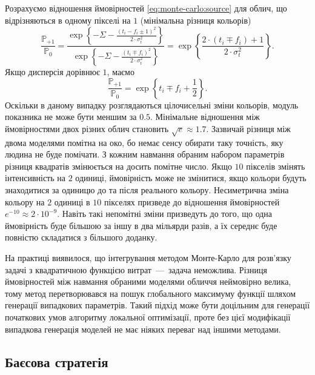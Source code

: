 Розрахуємо відношення ймовірностей \eqref{eq:monte-carlo:source} для облич,
що відрізняються в одному пікселі на $1$ (мінімальна різниця кольорів)
\begin{equation*}
  \frac{\mathbb{P}_{+1}}{\mathbb{P}_{0}}
  = \frac
    {\exp\left\{- \Sigma - \frac{\left( t_i - f_i \pm 1 \right)^2}{2 \cdot \sigma_t^2}\right\}}
    {\exp\left\{- \Sigma - \frac{\left( t_i \mp f_i \right)^2}{2 \cdot \sigma_t^2}\right\}}
  = \exp{\left\{ \frac{2 \cdot \left( t_i \mp f_i \right) + 1}{2 \cdot \sigma_t^2} \right\}}.
\end{equation*}
Якщо дисперсія дорівнює $1$, маємо
\begin{equation*}
  \frac{\mathbb{P}_{+1}}{\mathbb{P}_{0}}
  = \exp{\left\{ t_i \mp f_i + \frac{1}{2} \right\}}.
\end{equation*}
Оскільки в даному випадку розглядаються цілочисельні зміни кольорів,
модуль показника не може бути меншим за $0.5$.
Мінімальне відношення між ймовірностями двох різних облич
становить $\sqrt{e} \approx 1.7$.
Зазвичай різниця між двома моделями помітна на око,
бо немає сенсу обирати таку точність, яку людина не буде помічати.
З кожним навмання обраним набором параметрів
різниця квадратів змінюється на досить помітне число.
Якщо $10$ пікселів змінять інтенсивність на $2$ одиниці,
ймовірність може не змінитися,
якщо кольори будуть знаходитися за одиницю до та після реального кольору.
Несиметрична зміна кольору на $2$ одиниці в $10$ пікселях призведе
до відношення ймовірностей $e^{-10} \approx 2 \cdot 10^{-9}$.
Навіть такі непомітні зміни призведуть до того,
що одна ймовірність буде більшою за іншу в два мільярди разів,
а їх середнє буде повністю складатися з більшого доданку.

На практиці виявилося,
що інтегрування методом Монте-Карло
для розв'язку задачі з квадратичною функцією витрат~---~задача неможлива.
Різниця ймовірностей між навмання обраними моделями обличчя неймовірно велика,
тому метод перетворювався на пошук глобального максимуму функції
шляхом генерації випадкових параметрів.
Такий підхід може бути доцільним
для генерації початкових умов алгоритму локальної оптимізації,
проте без цієї модифікації випадкова генерація моделей
не має ніяких переваг над іншими методами.

\subsection{Баєсова стратегія}

